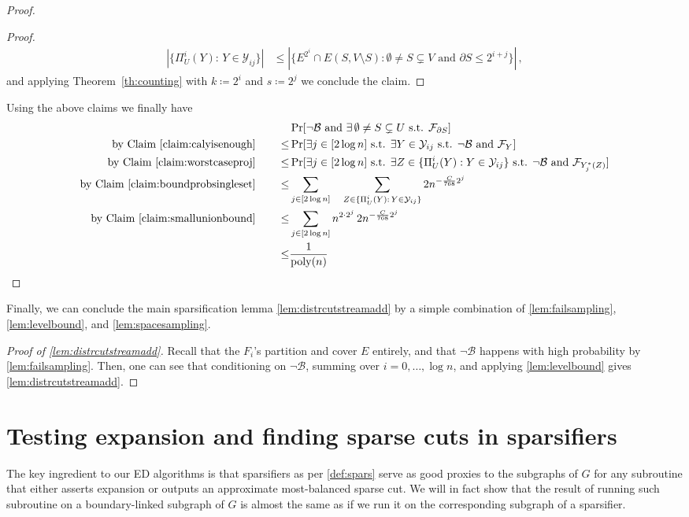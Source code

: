 \documentclass[epsfig,letter,11pt]{article}
\numberwithin{equation}{section}
\newcommand{\uncutg}[1]{{\partial} #1}
\DeclareMathOperator*{\poly}{poly}
\begin{document}
\begin{proof}
\begin{proof}
	\begin{align*}
		|\{\Pi_U^i(Y) : \, Y \in \mathcal{Y}_{ij}\}|
		& \le |\{E^{2^i} \cap E(S,V\setminus S) : \emptyset \neq S \subsetneq V \text{ and } \uncutg{S} \le 2^{i+j}\}| \, ,
	\end{align*}
	and applying Theorem~\ref{th:counting} with $k \coloneqq 2^i$ and $s \coloneqq 2^j$ we conclude the claim.
\end{proof}
\noindent
Using the above claims we finally have
\begin{align*}
	& \Pr[\neg\mathcal{B} \text{ and } \exists \, \emptyset \neq S \subsetneq U \text{ s.t. } \mathcal{F}_{\uncutg{S}}] \\
	\text{by Claim~\ref{claim:calyisenough}} \quad  \quad \le & \Pr[\exists j \in [2\log n] \text{ s.t. } \exists Y \in \mathcal{Y}_{ij} \text{ s.t. } \neg\mathcal{B} \text{ and } \mathcal{F}_{Y}] \\
	\text{by Claim~\ref{claim:worstcaseproj}} \quad  \quad \le & \Pr[\exists j \in [2\log n] \text{ s.t. } \exists Z \in \{\Pi_U^i(Y): Y \in \mathcal{Y}_{ij}\} \text{ s.t. }  \neg\mathcal{B} \text{ and } \mathcal{F}_{Y_j^*(Z)}] \\
	\text{by Claim~\ref{claim:boundprobsingleset}} \quad  \quad \le & \sum_{j \in [2\log n]} \quad \sum_{ Z \in \{\Pi_U^i(Y) : \, Y \in \mathcal{Y}_{ij}\}} 2n^{-\frac{C}{768}2^j} \\
	\text{by Claim~\ref{claim:smallunionbound}} \quad  \quad \le & \sum_{j \in [2\log n]} n^{2 \cdot 2^{j}}\, 2n^{-\frac{C}{768}2^j} \\
	\le & \frac{1}{\poly(n)}
\end{align*}
\end{proof}
\noindent
Finally, we can conclude the main sparsification lemma \cref{lem:distrcutstreamadd} by a simple combination of \cref{lem:failsampling}, \cref{lem:levelbound}, and \cref{lem:spacesampling}.

\begin{proof}[Proof of \cref{lem:distrcutstreamadd}]
Recall that the $F_i$'s partition and cover $E$ entirely, and that $\neg\mathcal{B}$ happens with high probability by \cref{lem:failsampling}. Then, one can see that conditioning on $\neg \mathcal{B}$, summing over $i=0,\dots, \log n$, and applying \cref{lem:levelbound} gives \cref{lem:distrcutstreamadd}.
\end{proof}
\section{Testing expansion and finding sparse cuts in sparsifiers}
\label{sec:balsparse}
The key ingredient to our ED algorithms is that sparsifiers as per \cref{def:spars} serve as good proxies to the subgraphs of $G$ for any subroutine that either asserts expansion or outputs an approximate most-balanced sparse cut. We will in fact show that the result of running such subroutine on a boundary-linked subgraph of $G$ is almost the same as if we run it on the corresponding subgraph of a sparsifier.
\end{document}
